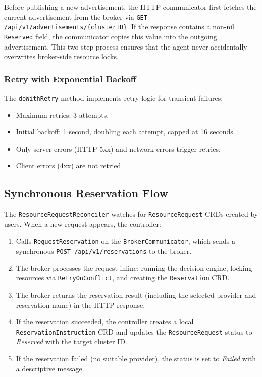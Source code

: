 Before publishing a new advertisement, the HTTP communicator first fetches the current advertisement from the broker via \texttt{GET /api/v1/advertisements/\{clusterID\}}. If the response contains a non-nil \texttt{Reserved} field, the communicator copies this value into the outgoing advertisement. This two-step process ensures that the agent never accidentally overwrites broker-side resource locks.

\subsubsection{Retry with Exponential Backoff}

The \texttt{doWithRetry} method implements retry logic for transient failures:
\begin{itemize}
    \item Maximum retries: 3 attempts.
    \item Initial backoff: 1 second, doubling each attempt, capped at 16 seconds.
    \item Only server errors (HTTP 5xx) and network errors trigger retries.
    \item Client errors (4xx) are not retried.
\end{itemize}

\subsection{Synchronous Reservation Flow}
\label{subsec:sync-reservation}

The \texttt{ResourceRequestReconciler} watches for \texttt{ResourceRequest} CRDs created by users. When a new request appears, the controller:

\begin{enumerate}
    \item Calls \texttt{RequestReservation} on the \texttt{BrokerCommunicator}, which sends a synchronous \texttt{POST /api/v1/reservations} to the broker.
    \item The broker processes the request inline: running the decision engine, locking resources via \texttt{RetryOnConflict}, and creating the \texttt{Reservation} CRD.
    \item The broker returns the reservation result (including the selected provider and reservation name) in the HTTP response.
    \item If the reservation succeeded, the controller creates a local \texttt{ReservationInstruction} CRD and updates the \texttt{ResourceRequest} status to \textit{Reserved} with the target cluster ID.
    \item If the reservation failed (no suitable provider), the status is set to \textit{Failed} with a descriptive message.
\end{enumerate}

